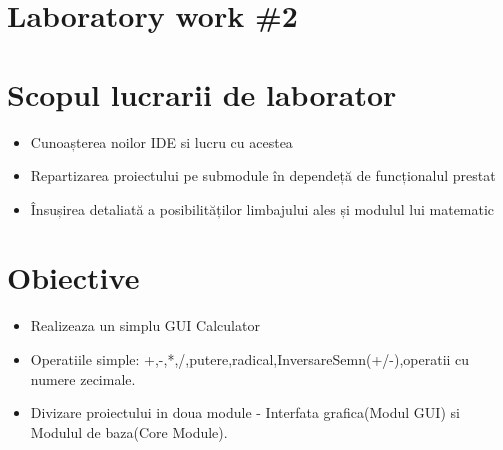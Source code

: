 \section*{Laboratory work \#2}

\section{Scopul lucrarii de laborator}
	\begin{itemize}
		\item Cunoașterea noilor IDE si lucru cu acestea
		\item Repartizarea proiectului pe submodule în dependeță de funcționalul prestat
		\item Însușirea detaliată a posibilităților limbajului ales și modulul lui matematic
	\end{itemize}		
	
\section{Obiective}

	\begin{itemize}
		\item Realizeaza un simplu GUI Calculator
		\item Operatiile simple: +,-,*,/,putere,radical,InversareSemn(+/-),operatii cu numere zecimale.
		\item Divizare proiectului in doua module - Interfata grafica(Modul GUI) si Modulul de baza(Core Module).
	\end{itemize}

\clearpage